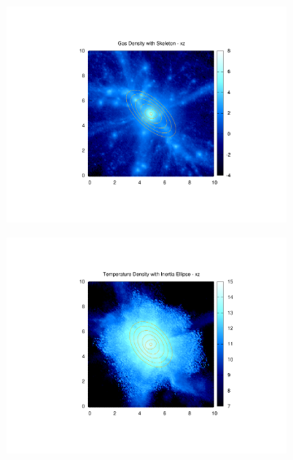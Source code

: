 \documentclass[journal]{IEEEtran}
\begin{document}
\begin{figure}[!t]
\begin{subfigure}[t]{0.3\textwidth}
		\includegraphics[width=\linewidth]{GasDenEllipxz}
	\end{subfigure}
	\quad
	\begin{subfigure}[t]{0.3\textwidth}
		\centering
		\includegraphics[width=\linewidth]{TempDenEllipxz}
	\end{subfigure}
	\\
	\begin{subfigure}[t]{0.3\textwidth}
		\centering

\end{subfigure}
\end{figure}
\end{document}
